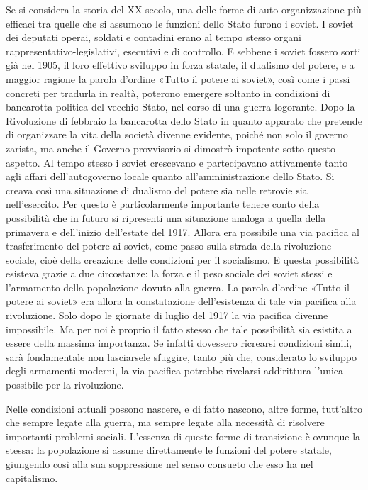 \documentclass[12pt,a4paper,openany]{book}
\begin{document}
Se si considera la storia del XX secolo, una delle forme di auto-organizzazione più efficaci tra quelle che si assumono le funzioni dello Stato furono i soviet. I soviet dei deputati operai, soldati e contadini erano al tempo stesso organi rappresentativo-legislativi, esecutivi e di controllo. E sebbene i soviet fossero sorti già nel 1905, il loro effettivo sviluppo in forza statale, il dualismo del potere, e a maggior ragione la parola d'ordine «Tutto il potere ai soviet», così come i passi concreti per tradurla in realtà, poterono emergere soltanto in condizioni di bancarotta politica del vecchio Stato, nel corso di una guerra logorante. Dopo la Rivoluzione di febbraio la bancarotta dello Stato in quanto apparato che pretende di organizzare la vita della società divenne evidente, poiché non solo il governo zarista, ma anche il Governo provvisorio si dimostrò impotente sotto questo aspetto. Al tempo stesso i soviet crescevano e partecipavano attivamente tanto agli affari dell'autogoverno locale quanto all'amministrazione dello Stato. Si creava così una situazione di dualismo del potere sia nelle retrovie sia nell'esercito. Per questo è particolarmente importante tenere conto della possibilità che in futuro si ripresenti una situazione analoga a quella della primavera e dell'inizio dell'estate del 1917. Allora era possibile una via pacifica al trasferimento del potere ai soviet, come passo sulla strada della rivoluzione sociale, cioè della creazione delle condizioni per il socialismo. E questa possibilità esisteva grazie a due circostanze: la forza e il peso sociale dei soviet stessi e l'armamento della popolazione dovuto alla guerra. La parola d'ordine «Tutto il potere ai soviet» era allora la constatazione dell'esistenza di tale via pacifica alla rivoluzione. Solo dopo le giornate di luglio del 1917 la via pacifica divenne impossibile. Ma per noi è proprio il fatto stesso che tale possibilità sia esistita a essere della massima importanza. Se infatti dovessero ricrearsi condizioni simili, sarà fondamentale non lasciarsele sfuggire, tanto più che, considerato lo sviluppo degli armamenti moderni, la via pacifica potrebbe rivelarsi addirittura l'unica possibile per la rivoluzione.

Nelle condizioni attuali possono nascere, e di fatto nascono, altre forme, tutt'altro che sempre legate alla guerra, ma sempre legate alla necessità di risolvere importanti problemi sociali. L'essenza di queste forme di transizione è ovunque la stessa: la popolazione si assume direttamente le funzioni del potere statale, giungendo così alla sua soppressione nel senso consueto che esso ha nel capitalismo.
\end{document}
